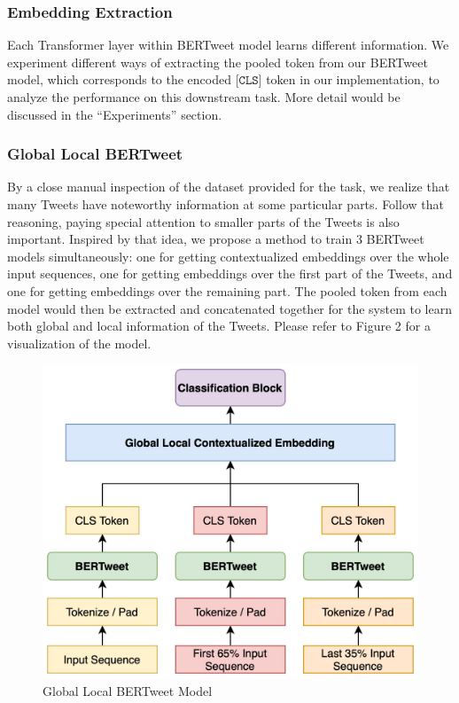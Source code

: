 \documentclass[11pt,a4paper]{article}
\begin{document}
\subsubsection{Embedding Extraction}
Each Transformer layer within BERTweet model learns different information. We experiment different ways of extracting the pooled token from our BERTweet model, which corresponds to the encoded $\texttt{[CLS]}$ token in our implementation, to analyze the performance on this downstream task. More detail would be discussed in the ``Experiments'' section.

\subsubsection{Global Local BERTweet}
By a close manual inspection of the dataset provided for the task, we realize that many Tweets have noteworthy information at some particular parts. Follow that reasoning, paying special attention to smaller parts of the Tweets is also important. Inspired by that idea, we propose a method to train 3 BERTweet models simultaneously: one for getting contextualized embeddings over the whole input sequences, one for getting embeddings over the first part of the Tweets, and one for getting embeddings over the remaining part. The pooled token from each model would then be extracted and concatenated together for the system to learn both global and local information of the Tweets. Please refer to Figure 2 for a visualization of the model.

\begin{figure}[ht]
    \centering
    \includegraphics[width=\columnwidth]{GlobalLocalModel.jpg}
    \caption{Global Local BERTweet Model}
    \label{fig:model}
\end{figure}
\end{document}
